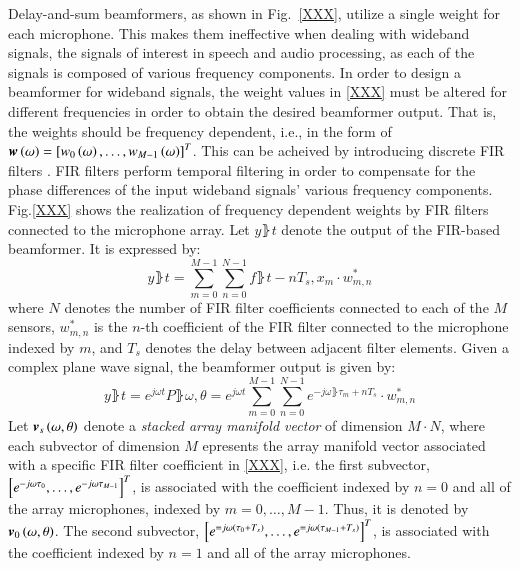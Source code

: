 Delay-and-sum beamformers, as shown in Fig.~\ref{XXX}, utilize a single weight for each microphone. 
This makes them ineffective when dealing with wideband signals, the signals of interest in speech and audio processing, as each of the signals is composed of various frequency components. 
In order to design a beamformer for wideband signals, the weight values in \eqref{XXX} must be altered for different frequencies in order to obtain the desired beamformer output. 
That is, the weights should be frequency dependent, i.e., in the form of $\boldsymbol{w}\left({\omega}\right)=\left[{w_{0}\left({\omega}\right),\dots,w_{M-1}\left({\omega}\right)}\right]^{T}$. 
This can be acheived by introducing discrete FIR filters \cite{yan2005design,liu2010wideband}.
FIR filters perform temporal filtering in order to compensate for the phase differences of the input wideband signals’ various frequency components. 
Fig.\ref{XXX} shows the realization of frequency dependent weights by FIR filters connected to the microphone array.
Let $y\rBrace{t}$ denote the output of the FIR-based beamformer. 
It is expressed by:
\begin{equation}
y\rBrace{t}=\sum_{m=0}^{M-1}\sum_{n=0}^{N-1}f\rBrace{t-nT_{s},x_{m}}\cdot{}w_{m,n}^{*}
\end{equation}
where $N$ denotes the number of FIR filter coefficients connected to each of the $M$ sensors, $w_{m,n}^{*}$ is the $n$-th coefficient of the FIR filter connected to the microphone indexed by $m$, and $T_{s}$ denotes the delay between adjacent filter elements. 
Given a complex plane wave signal, the beamformer output is given by:
\begin{equation}
y\rBrace{t}=e^{j\omega{}t}P\rBrace{\omega,\theta}=e^{j\omega{}t}\sum_{m=0}^{M-1}\sum_{n=0}^{N-1}e^{-j\omega\rBrace{\tau_{m}+nT_{s}}}\cdot{}w_{m,n}^{*}
\end{equation}
Let $\boldsymbol{v}_{s}\left({\omega,\theta}\right)$ denote a \emph{stacked array manifold vector} of dimension $M\cdot{}N$, where each subvector of dimension $M$ epresents the array manifold vector associated with a specific FIR filter coefficient in \eqref{XXX}, i.e. the first subvector, $\left[{e^{-j\omega\tau_{0}},\dots,e^{-j\omega\tau_{M-1}}}\right]^{T}$, is associated with the coefficient indexed by $n=0$ and all of the array microphones, indexed by $m=0,\dots,M-1$.
Thus, it is denoted by $\boldsymbol{v}_{0}\left({\omega,\theta}\right)$.
The second subvector, $\left[{e^{=j\omega\left({\tau_{0}+T_{s}}\right)},\dots,e^{=j\omega\left({\tau_{M-1}+T_{s}}\right)}}\right]^{T}$, is associated with the coefficient indexed by $n=1$ and all of the array microphones.
